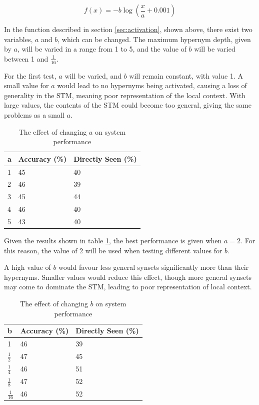 \documentclass[]{article}
\begin{document}
\[f(x) = -b\log(\frac{x}{a}+0.001)\]

In the function described in section \ref{sec:activation}, shown above, there exist two variables, $a$ and $b$, which can be changed. The maximum hypernym depth, given by $a$, will be varied in a range from 1 to 5, and the value of $b$ will be varied between 1 and $\frac{1}{16}$.

For the first test, $a$ will be varied, and $b$ will remain constant, with value 1. A small value for $a$ would lead to no hypernyms being activated, causing a loss of generality in the STM, meaning poor representation of the local context. With large values, the contents of the STM could become too general, giving the same problems as a small $a$.

\begin{table}
\begin{center}
\begin{tabular}{|p{2em}|p{7em}|p{7em}|}
	\hline
	a & Accuracy (\%) & Directly Seen (\%) \\
	\hline
	1 & 45 & 40\\
	\hline
	2 & 46 & 39\\
	\hline
	3 & 45 & 44\\
	\hline
	4 & 46 & 40\\
	\hline
	5 & 43 & 40\\
	\hline
\end{tabular}
\end{center}
\caption{The effect of changing $a$ on system performance}
\label{table:aActivation}
\end{table}

Given the results shown in table \ref{table:aActivation}, the best performance is given when $a = 2$. For this reason, the value of 2 will be used when testing different values for $b$.

A high value of $b$ would favour less general synsets significantly more than their hypernyms. Smaller values would reduce this effect, though more general synsets may come to dominate the STM, leading to poor representation of local context.

\begin{table}
\begin{center}
\begin{tabular}{|p{2em}|p{7em}|p{7em}|}
	\hline
	b & Accuracy (\%) & Directly Seen (\%) \\
	\hline
	1 & 46 & 39\\
	\hline
	$\frac{1}{2}$ & 47 & 45\\
	\hline
	$\frac{1}{4}$ & 46 & 51\\
	\hline
	$\frac{1}{8}$ & 47 & 52\\
	\hline
	$\frac{1}{16}$ & 46 & 52\\
	\hline
\end{tabular}
\end{center}
\caption{The effect of changing $b$ on system performance}
\label{table:bActivation}
\end{table}
\end{document}
